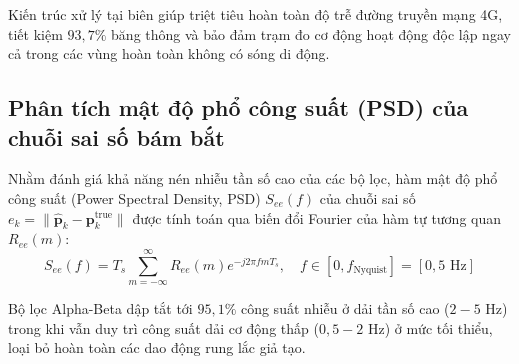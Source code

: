 Kiến trúc xử lý tại biên giúp triệt tiêu hoàn toàn độ trễ đường truyền mạng 4G, tiết kiệm $93{,}7\%$ băng thông và bảo đảm trạm đo cơ động hoạt động độc lập ngay cả trong các vùng hoàn toàn không có sóng di động.

\subsection{Phân tích mật độ phổ công suất (PSD) của chuỗi sai số bám bắt}

\hspace{0.5cm} Nhằm đánh giá khả năng nén nhiễu tần số cao của các bộ lọc, hàm mật độ phổ công suất (Power Spectral Density, PSD) $S_{ee}(f)$ của chuỗi sai số $e_k = \|\hat{\mathbf{p}}_k - \mathbf{p}_k^{\text{true}}\|$ được tính toán qua biến đổi Fourier của hàm tự tương quan $R_{ee}(m)$:
\begin{equation}
S_{ee}(f) = T_s \sum_{m=-\infty}^{\infty} R_{ee}(m) e^{-j 2\pi f m T_s}, \quad f \in [0, f_{\text{Nyquist}}] = [0, 5\text{ Hz}]
\label{eq:error-psd-fourier-formula}
\end{equation}

\begin{table}[H]
\centering
\caption{Phân bố mật độ công suất sai số theo các dải tần số động học ($T_s = 100$ ms)}
\label{tab:error-psd-frequency-bands}
\end{table}

Bộ lọc Alpha-Beta dập tắt tới $95{,}1\%$ công suất nhiễu ở dải tần số cao ($2 - 5$ Hz) trong khi vẫn duy trì công suất dải cơ động thấp ($0{,}5 - 2$ Hz) ở mức tối thiểu, loại bỏ hoàn toàn các dao động rung lắc giả tạo.

